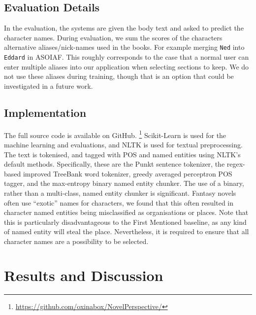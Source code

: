 \documentclass[]{book}
\begin{document}
\subsection{Evaluation Details}
In the evaluation, the systems are given the body text and asked to predict the character names.
During evaluation, we sum the scores of the characters alternative aliases/nick-names used in the  books.
For example merging \texttt{Ned} into \texttt{Eddard} in ASOIAF.
This roughly corresponds to the case that a normal user can enter multiple aliases into our application when selecting sections to keep.
We do not use these aliases during training, though that is an option that could be investigated in a future work.

\subsection{Implementation}
The full source code is available on GitHub.
\footnote{\url{https://github.com/oxinabox/NovelPerspective/}}
Scikit-Learn \parencite{scikit-learn} is used for the machine learning and evaluations,
and NLTK \parencite{NLTK} is used for textual preprocessing.
The text is tokenised, and tagged with POS and named entities using NLTK's default methods.
Specifically, these are the Punkt sentence tokenizer, the regex-based improved TreeBank word tokenizer, greedy averaged perceptron POS tagger, and the max-entropy binary named entity chunker.
The use of a binary, rather than a multi-class, named entity chunker is significant.
Fantasy novels often use ``exotic'' names for characters, we found that this often resulted in character named entities being misclassified as organisations or places.
Note that this is particularly disadvantageous to the First Mentioned baseline, as any kind of named entity will steal the place.
Nevertheless, it is required to ensure that all character names are a possibility to be selected.


\section{Results and Discussion}\label{sec:results-and-discussion}

\begin{table}
	\begin{adjustbox}{max width=\columnwidth}
		
	\end{adjustbox}
	
	\caption{The results of the character classifier systems. The best results are \textbf{bolded}.
	} \label{tbl:resmain}
\end{table}
\end{document}
